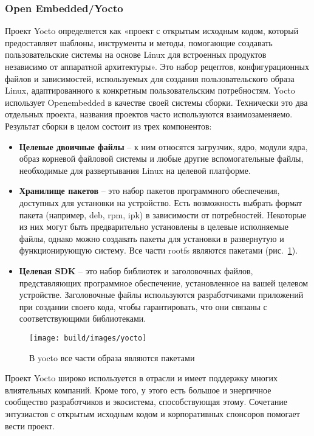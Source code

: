 \subsubsection{Open Embedded/Yocto}
Проект Yocto определяется как «проект с открытым исходным кодом, который предоставляет шаблоны, инструменты и методы, помогающие создавать пользовательские системы на основе Linux для встроенных продуктов независимо от аппаратной архитектуры»\cite{YOCTO}. 
Это набор рецептов, конфигурационных файлов и зависимостей, используемых для создания пользовательского образа Linux, адаптированного к конкретным пользовательским потребностям.
Yocto использует Openembedded в качестве своей системы сборки. 
Технически это два отдельных проекта, названия проектов часто используются взаимозаменяемо.
Результат сборки в целом состоит из трех компонентов:
\begin{itemize}
  \item \textbf{Целевые двоичные файлы} -- к ним относятся загрузчик, ядро, модули ядра, образ корневой файловой системы и любые другие вспомогательные файлы, необходимые для развертывания Linux на целевой платформе.
  \item \textbf{Хранилище пакетов} -- это набор пакетов программного обеспечения, доступных для установки на устройство. 
Есть возможность выбрать формат пакета (например, deb, rpm, ipk) в зависимости от потребностей. 
Некоторые из них могут быть предварительно установлены в целевые исполняемые файлы, однако можно создавать пакеты для установки в развернутую и функционирующую систему.
Все части rootfs являются пакетами (рис.~\ref{fig: yocto}).
  \item \textbf{Целевая SDK} --  это набор библиотек и заголовочных файлов, представляющих программное обеспечение, установленное на вашей целевом устройстве. 
Заголовочные файлы используются разработчиками приложений при создании своего кода, чтобы гарантировать, что они связаны с соответствующими библиотеками.
\end{itemize}

\begin{figure}[h!]
  \centering
  \setlength{\fboxsep}{5pt}
  \texttt{[image: build/images/yocto]}
  \caption{В yocto все части образа являются пакетами}\label{fig: yocto}
\end{figure}

Проект Yocto широко используется в отрасли и имеет поддержку многих влиятельных компаний. Кроме того, у этого есть большое и энергичное сообщество разработчиков и экосистема, способствующая этому. Сочетание энтузиастов с открытым исходным кодом и корпоративных спонсоров помогает вести проект\cite{YOCTO}.

